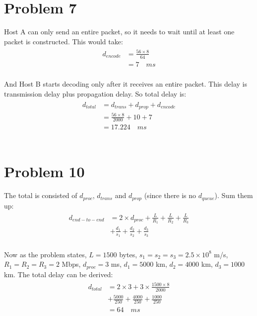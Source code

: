 \documentclass[titlepage, paper=a4, fontsize=11pt]{scrartcl} %
\numberwithin{equation}{section} %
\numberwithin{figure}{section} %
\numberwithin{table}{section} %
\begin{document}

\section*{Problem 7}
Host A can only send an entire packet, so it needs to wait until at least one packet is constructed. This would take:
\begin{align*} 
\begin{split}
d_{encode} &= \frac{56 \times 8}{64} \\
&= 7 \quad ms
\end{split}					
\end{align*}
\\
And Host B starts decoding only after it receives an entire packet. This delay is transmission delay plus propagation delay. So total delay is:
\begin{align*} 
\begin{split}
d_{total} &= d_{trans} + d_{prop} + d_{encode} \\
&= \frac{56 \times 8}{2000} + 10 + 7 \\
&= 17.224 \quad ms
\end{split}					
\end{align*}
\\



\section*{Problem 10}
The total is consisted of $d_{proc}$, $d_{trans}$ and $d_{prop}$ (since there is no $d_{queue}$). Sum them up:
\begin{align*} 
\begin{split}
d_{end-to-end} &= 2 \times d_{proc} + \frac{L}{R_1} + \frac{L}{R_2} + \frac{L}{R_3} \\
&+ \frac{d_1}{s_1} + \frac{d_2}{s_2} + \frac{d_3}{s_3}
\end{split}					
\end{align*}
\\
Now as the problem states, $L = 1500$ bytes, $s_1 = s_2 = s_3 = 2.5 \times 10^8$ m/s,
$R_1 = R_2 = R_3 = 2$ Mbps, $d_{proc} = 3$ ms, $d_1 = 5000$ km, $d_2 = 4000$ km, $d_3 = 1000$ km.
The total delay can be derived:
\begin{align*} 
\begin{split}
d_{total} &= 2 \times 3 + 3 \times \frac{1500 \times 8}{2000} \\
&+ \frac{5000}{250} + \frac{4000}{250} + \frac{1000}{250}\\
&= 64 \quad ms
\end{split}					
\end{align*}
\\
\end{document}
